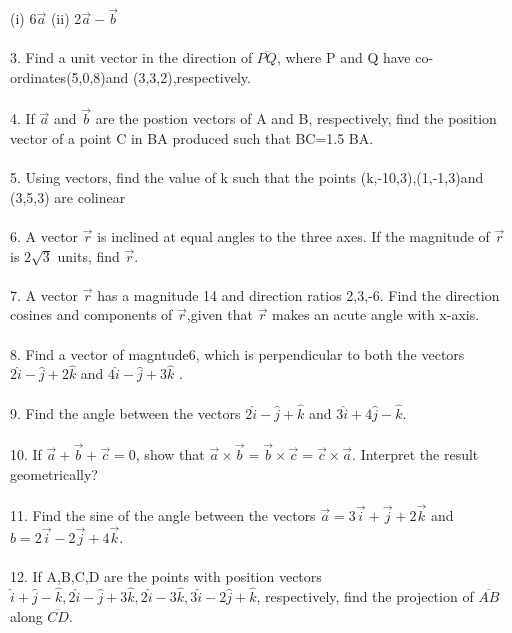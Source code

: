 \documentclass{article}
\begin{document}
(i) 6$\overrightarrow{a}$ \hspace{2cm}  (ii) 2$\overrightarrow{a}-\overrightarrow{b}$
\\
\\
3. Find a unit vector in the direction of $\overline{PQ}$, where P and Q have co-ordinates(5,0,8)and (3,3,2),respectively.
\\
\\
4. If $\overrightarrow{a}$ and $\overrightarrow{b}$ are the postion vectors of A and B, respectively, find the position vector of a point C in BA produced such that BC=1.5 BA.
\\
\\
5. Using vectors, find the value of k such that the points (k,-10,3),(1,-1,3)and (3,5,3) are colinear
\\
\\
6. A vector $\overrightarrow{r}$ is inclined at equal angles to the three axes. If the magnitude of $\overrightarrow{r}$ is $2\sqrt{3}$ units, find $\overrightarrow{r}$.
\\
\\
7. A vector $\overrightarrow{r}$ has a magnitude 14 and direction ratios 2,3,-6. Find the direction cosines and components of $\overrightarrow{r}$,given that $\overrightarrow{r}$ makes an acute angle with x-axis.
\\
\\
8. Find a vector of magntude6, which is perpendicular to both the vectors $2\hat{i}-\hat{j}+2\hat{k}$ and $4\hat{i}-\hat{j}+3\hat{k}$ .
\\
\\
9. Find the angle between the vectors $ 2\hat{i}-\hat{j}+\hat{k}$ and $3\hat{i}+4\hat{j}-\hat{k}$.
\\
\\
10. If $\overrightarrow{a}+\overrightarrow{b}+\overrightarrow{c}=0$, show that $\overrightarrow{a}\times\overrightarrow{b}=\overrightarrow{b}\times\overrightarrow{c}=\overrightarrow{c}\times\overrightarrow{a}$. Interpret the result geometrically?
\\
\\
11. Find the sine of the angle between the vectors $\overrightarrow{a}=3\overrightarrow{i}+\overrightarrow{j}+2\overrightarrow{k}$ and $b=2\overrightarrow{i}-2\overrightarrow{j}+4\overrightarrow{k}$.
\\
\\
12. If A,B,C,D  are the points with position vectors $\hat{i}+\hat{j}-\hat{k}, 2\hat{i}-\hat{j}+3\hat{k} , 2\hat{i}-3\hat{k}, 3\hat{i}-2\hat{j}+\hat{k}$, respectively, find the projection of $\overline{AB}$ along $\overline{CD}$.
\end{document}
